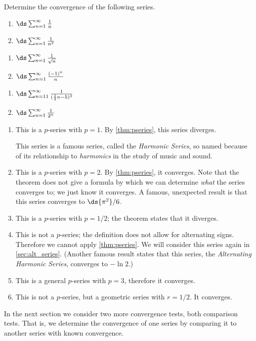 {Determine the convergence of the following series.\\

\noindent\begin{minipage}[t]{.33\linewidth}
\begin{enumerate}
\item		$\ds\sum_{n=1}^\infty \frac{1}{n}$
\item		$\ds\sum_{n=1}^\infty \frac{1}{n^2}$
\end{enumerate}
\end{minipage}%
\begin{minipage}[t]{.33\linewidth}
\begin{enumerate}\addtocounter{enumi}{2}
\item		$\ds\sum_{n=1}^\infty \frac{1}{\sqrt{n}}$
\item		$\ds\sum_{n=1}^\infty \frac{(-1)^n}{n}$
\end{enumerate}
\end{minipage}%
\begin{minipage}[t]{.33\linewidth}
\begin{enumerate}\addtocounter{enumi}{4}
\item		$\ds\sum_{n=11}^\infty \frac{1}{(\frac12n-5)^3}$
\item		$\ds\sum_{n=1}^\infty \frac{1}{2^n}$
\end{enumerate}
\end{minipage}
}
{\begin{enumerate}
\item	This is a $p$-series with $p=1$. By \autoref{thm:pseries}, this series diverges.

This series is a famous series, called the \emph{Harmonic Series}, so named because of its relationship to \emph{harmonics} in the study of music and sound. 

\item	This is a $p$-series with $p=2$. By \autoref{thm:pseries}, it converges. Note that the theorem does not give a formula by which we can determine \emph{what} the series converges to; we just know it converges. A famous, unexpected result is that this series converges to $\ds{\pi^2}/{6}$.

\item	This is a $p$-series with $p=1/2$; the theorem states that it diverges.

\item	This is not a $p$-series; the definition does not allow for alternating signs. Therefore we cannot apply \autoref{thm:pseries}. We will consider this series again in \autoref{sec:alt_series}.
(Another famous result states that this series, the \emph{Alternating Harmonic Series}, converges to $-\ln 2$.)

\item	This is a general $p$-series with $p=3$, therefore it converges.

\item	This is not a $p$-series, but a geometric series with $r=1/2$. It converges.
\eoehere
\end{enumerate}}

In the next section we consider two more convergence tests, both comparison tests. That is, we determine the convergence of one series by  comparing it to another series with known convergence. 

